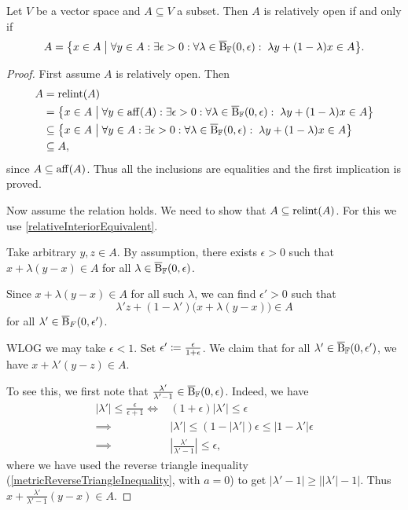 \begin{lemma}
Let $V$ be a vector space and $A\subseteq V$ a subset. Then $A$ is relatively open \textup{if and only if}
\[ A = \setbuilder{x\in A}{\forall y\in A: \exists \epsilon >0: \forall \lambda \in \cball_\F(0,\epsilon):\; \lambda y + (1-\lambda)x \in A}. \]
\end{lemma}
\begin{proof}
First assume $A$ is relatively open. Then
\begin{align*}
A &= \relint(A) \\
&= \setbuilder{x\in A}{\forall y\in \affine(A): \exists \epsilon >0: \forall \lambda \in \cball_\F(0,\epsilon):\; \lambda y + (1-\lambda) x \in A} \\
&\subseteq \setbuilder{x\in A}{\forall y\in A: \exists \epsilon >0: \forall \lambda \in \cball_\F(0,\epsilon):\; \lambda y + (1-\lambda) x \in A} \\
&\subseteq A,
\end{align*}
since $A \subseteq \operatorname{aff}(A)$. Thus all the inclusions are equalities and the first implication is proved.

Now assume the relation holds. We need to show that $A\subseteq \operatorname{relint}(A)$. For this we use \ref{relativeInteriorEquivalent}.

Take arbitrary $y,z\in A$. By assumption, there exists $\epsilon > 0$ such that $x+\lambda(y-x)\in A$ for all $\lambda \in \operatorname{\overline{B}}_{\mathbb{F}}(0,\epsilon)$. 

Since $x+\lambda(y-x)\in A$ for all such $\lambda$, we can find $\epsilon' > 0$ such that
\[ \lambda' z + (1-\lambda')\big(x+\lambda(y-x)\big) \in A \]
for all $\lambda'\in \operatorname{\overline{B}}_F(0,\epsilon')$.







WLOG we may take $\epsilon < 1$. Set $\epsilon' \coloneqq \frac{\epsilon}{1+\epsilon}$. We claim that for all $\lambda'\in \operatorname{\overline{B}}_{\mathbb{F}}(0,\epsilon')$, we have $x + \lambda' (y-z) \in A$.

To see this, we first note that $\frac{\lambda'}{\lambda'-1} \in \operatorname{\overline{B}}_{\mathbb{F}}(0,\epsilon)$. Indeed, we have
\begin{align*}
|\lambda'|\leq \frac{\epsilon}{\epsilon +1} \iff& (1+\epsilon)|\lambda'| \leq \epsilon \\
\implies& |\lambda'|\leq (1-|\lambda'|)\epsilon \leq \big|1-\lambda'|\epsilon \\
\implies& \left|\frac{\lambda'}{\lambda' - 1}\right| \leq \epsilon, 
\end{align*}
where we have used the reverse triangle inequality (\ref{metricReverseTriangleInequality}, with $a = 0$) to get $|\lambda' - 1|\geq \big||\lambda'| - 1 \big|$. Thus $x+ \frac{\lambda'}{\lambda' - 1}(y-x)\in A$. 
\end{proof}

